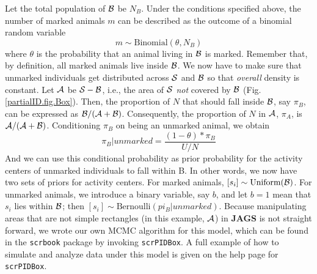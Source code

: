 Let the total population of ${\cal B}$ be $N_B$. %
Under the conditions specified above, the number of marked animals $m$ can be described as the outcome of a binomial random variable
\[
m \sim \mbox{Binomial}(\theta, N_B)
\]
where $\theta$ is the probability that an animal living in ${\cal B}$ is marked. Remember that, by definition, all marked animals live inside ${\cal B}$. We now have to make sure that unmarked individuals get distributed across ${\cal S}$ and ${\cal B}$ so that \emph{overall} density is constant. %
Let ${\cal A}$ be ${\cal S} - {\cal B}$, %
i.e., the area of ${\cal S}$ \emph{not} covered by ${\cal B}$ (Fig. \ref{partialID.fig.Box}). Then, the proportion of $N$ that should fall inside ${\cal B}$, say $\pi_B$, can be expressed as ${\cal B}/({\cal A}+{\cal B})$. Consequently, the proportion of $N$ in ${\cal A}$, $\pi_A$,
is ${\cal A}/({\cal A}+{\cal B})$.
Conditioning $\pi_B$ on being an unmarked animal, %
we obtain
\[
 \pi_B | unmarked = \frac{(1-\theta)* \pi_B}{U/N}
\]
And we can use this conditional probability as prior probability for the activity centers of unmarked individuals to fall within {\cal B}.
In other words, we now have two sets of priors for activity centers.
For marked animals, $[s_i]\sim \mbox{Uniform}({\cal B})$. For unmarked animals, we introduce a binary variable, say $b$, and let $b=1$ mean that $s_i$ lies within ${\cal B}$; then $[s_i]\sim \mbox{Bernoulli}(pi_B|unmarked)$.
Because manipulating areas that are not simple rectangles (in this example, ${\cal A}$) in {\bf JAGS} is not straight forward, we wrote our own MCMC algorithm for this model, which can be found in the {\tt scrbook} package by invoking {\tt scrPIDBox}. A full example of how to simulate and analyze data under this model is given on the help page for {\tt scrPIDBox}.

